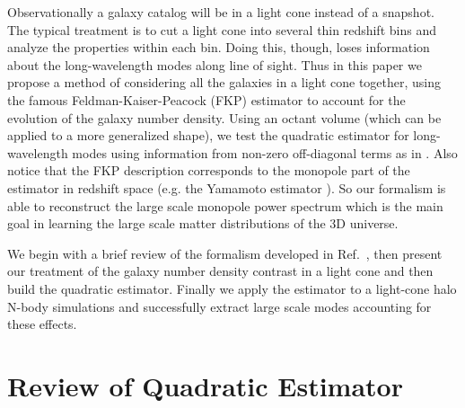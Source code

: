 \documentclass[prd,amsmath,amssymb,floatfix,superscriptaddress,nofootinbib,twocolumn]{revtex4-1}
\newcommand{\vrr}{\vec{r}}
\begin{document}
Observationally a galaxy catalog will be in a light cone \cite{Carroll:1997gr} instead of a snapshot. The typical  treatment is to cut a light cone into several thin redshift bins \cite{Chuang:2016uuz} and analyze the properties within each bin. Doing this, though, loses information about the long-wavelength modes along line of sight. Thus in this paper we propose a method of considering all the galaxies in a light cone together, using the famous Feldman-Kaiser-Peacock (FKP) estimator \cite{Feldman:1993ky} to account for the evolution of the galaxy number density. Using an octant volume (which can be applied to a more generalized shape), we test the quadratic estimator for long-wavelength modes using information from non-zero off-diagonal terms as in \cite{Li:2020fir}. Also notice that the FKP description corresponds to the monopole part of the estimator in redshift space (e.g. the Yamamoto estimator \cite{Yamamoto:2005dz}\cite{Bianchi:2015oia}). So our formalism is able to reconstruct the large scale monopole power spectrum which is the main goal in learning the large scale matter distributions of the 3D universe.


We begin with a brief review of the formalism developed in Ref.~\cite{Li:2020fir}, then present our treatment of the galaxy number density contrast in a light cone and then build the quadratic estimator. Finally we apply the estimator to a light-cone halo N-body simulations and successfully extract large scale modes accounting for these effects.
\clearpage


\section{Review of Quadratic Estimator} \label{sec2}
\end{document}

